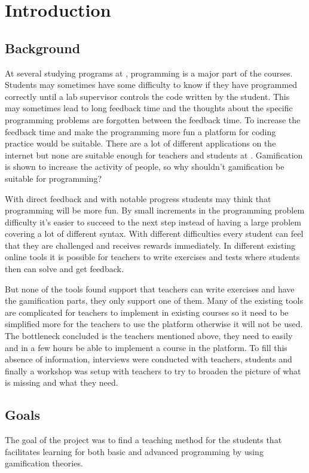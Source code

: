 \chapter{Introduction}
\section{Background} 
At several studying programs at \LTU, programming is a major part of the courses. Students may sometimes have some difficulty to know if they have programmed correctly until a lab supervisor controls the code written by the student. This may sometimes lead to long feedback time and the thoughts about the specific programming problems are forgotten between the feedback time. To increase the feedback time and make the programming more fun a platform for coding practice would be suitable. There are a lot of different applications on the internet but none are suitable enough for teachers and students at \LTU. Gamification is shown to increase the activity of people, so why shouldn't gamification be suitable for programming? 

With direct feedback and with notable progress students may think that programming will be more fun. By small increments in the programming problem difficulty it's easier to succeed to the next step instead of having a large problem covering a lot of different syntax. With different difficulties every student can feel that they are challenged and receives rewards immediately. In different existing online tools it is possible for teachers to write exercises and tests where students then can solve and get feedback. 

But none of the tools found support that teachers can write exercises and have the gamification parts, they only support one of them. Many of the existing tools are complicated for teachers to implement in existing courses so it need to be simplified more for the teachers to use the platform otherwise it will not be used. The bottleneck concluded is the teachers mentioned above, they need to easily and in a few hours be able to implement a course in the platform. To fill this absence of information, interviews were conducted with teachers, students and finally a workshop was setup with teachers to try to broaden the picture of what is missing and what they need.


\section{Goals}   
The goal of the project was to find a teaching method for the students that facilitates learning for both basic and advanced programming by using gamification theories.

